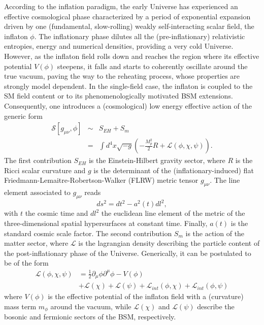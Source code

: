 \documentclass[%
aps,prd,nofootinbib,showkeys,a4paper,10pt
]{revtex4-2}
\begin{document}
According to the inflation paradigm, the early Universe has experienced  an effective cosmological phase characterized 
by a period of exponential expansion driven by one (fundamental, slow-rolling) weakly self-interacting scalar field, the inflaton $\phi$. 
The inflationary phase dilutes all the (pre-inflationary) relativistic entropies, energy and numerical densities, 
providing a very cold Universe.  
However, as the inflaton field rolls down and reaches the region where its effective potential $V(\phi)$ steepens, 
it falls and starts to coherently oscillate around the true vacuum,  
paving the way to the reheating process, whose properties are strongly model dependent.
In the single-field case, the inflaton is coupled to the SM field content or to its phenomenologically motivated BSM extensions. 
Consequently, one introduces a (cosmological) low energy effective action of the generic form
\begin{eqnarray}
\mathcal{S}\left[g_{\mu\nu},\phi\right]&\sim& S_{EH} + S_m \\ \nonumber
&=&\int d^4x\sqrt{-g} \left(-\frac{M_p^2}{2}R + \mathcal{L}(\phi,\chi,\psi)\right).
\end{eqnarray}
The first contribution $S_{EH}$ is the Einstein-Hilbert gravity sector, 
where $R$ is the Ricci scalar curvature and $g$ is the determinant of the (inflationary-induced) flat Friedmann-Lemaitre-Robertson-Walker (FLRW)
metric tensor $g_{\mu\nu}$. The line element associated to $g_{\mu\nu}$ reads
\begin{equation}
ds^2=dt^2 - a^2(t)dl^2, 
\end{equation}
with $t$ the cosmic time and $dl^2$ the euclidean line element of the metric of the three-dimensional spatial hypersurfaces at constant time. 
Finally, $a(t)$ is the standard cosmic scale factor.
The second contribution $S_m$ is the action of the matter sector,  where 
$\mathcal{L}$ is the lagrangian density describing the particle content of the post-inflationary phase of the Universe.  
Generically, it can be postulated to be of the form
\begin{align}
\mathcal{L}(\phi,\chi,\psi)&=\frac{1}{2}\partial_{\mu}\phi\partial^{\mu}\phi-V(\phi) \nonumber\\
&+\mathcal{L}(\chi)+\mathcal{L}(\psi)+\mathcal{L}_{int}(\phi,\chi) +\mathcal{L}_{int}(\phi,\psi) 
\label{eq:lag}\end{align}
where $V(\phi)$ is the effective potential of the inflaton field with a (curvature) mass term $m_{\phi}$ around the vacuum, 
while $\mathcal{L}(\chi)$ and $\mathcal{L}(\psi)$ describe the bosonic and fermionic sectors of the BSM, respectively.
\end{document}
